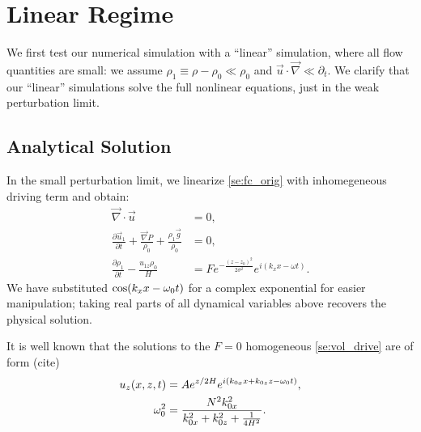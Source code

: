 \documentclass[twocolumn,
        usenames, %
        dvipsnames %
    ]{revtex4-1}%
\newcommand*{\pd}[2]{\frac{\partial#1}{\partial#2}}
\DeclarePairedDelimiter\p{\lparen}{\rparen}
\begin{document}
\section{Linear Regime}\label{s:lin}

We first test our numerical simulation with a ``linear'' simulation, where
all flow quantities are small: we assume  $\rho_1 \equiv \rho - \rho_0 \ll
\rho_0$ and $\vec{u} \cdot \vec{\nabla} \ll \partial_t$. We clarify that our
``linear'' simulations solve the full nonlinear equations, just in the weak
perturbation limit.

\subsection{Analytical Solution}

In the small perturbation limit, we linearize \autoref{se:fc_orig} with
inhomegeneous driving term and obtain:
\begin{subequations}\label{se:vol_drive}
    \begin{align}
        \vec{\nabla} \cdot \vec{u} &= 0,\\
        \pd{\vec{u}_1}{t} + \frac{\vec{\nabla}P}{\rho_0}
            + \frac{\rho_1 \vec{g}}{\rho_0}
            &= 0,\\
        \pd{\rho_1}{t} - \frac{u_{1z} \rho_0}{H}
            &= Fe^{-\frac{(z - z_0)^2}{2\sigma^2}}
                e^{i(k_xx - \omega t)}.
    \end{align}
\end{subequations}
We have substituted $\cos\p*{k_xx - \omega_0t}$ for a complex exponential for
easier manipulation; taking real parts of all dynamical variables above recovers
the physical solution.

It is well known that the solutions to the $F = 0$ homogeneous
\autoref{se:vol_drive} are of form (cite)
\begin{subequations}\label{se:lin_sol}
    \begin{align}
        u_z\p*{x, z, t} &= Ae^{z/2H}e^{i(k_{0x}x + k_{0z}z - \omega_0 t)},\\
        \omega_0^2 &= \frac{N^2k_{0x}^2}{k_{0x}^2 + k_{0z}^2 + \frac{1}{4H^2}}.
    \end{align}
\end{subequations}
\end{document}
